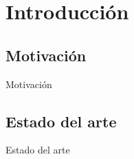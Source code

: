 
\section{Introducción}

\subsection{Motivación}
\begin{frame}{Motivación}

\end{frame}

\subsection{Estado del arte}
\begin{frame}{Estado del arte}

\end{frame}
